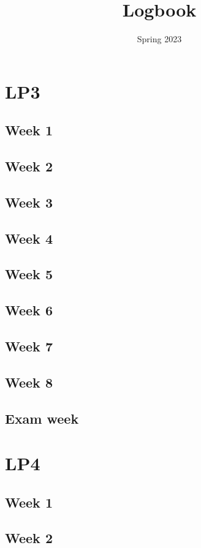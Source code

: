 \documentclass{article}
\title{Logbook}
\date{Spring 2023}
\newcommand{\logentry}[2]{
    \subsection{Week #2}
    
    \newpage
}
\newcommand{\customlogentry}[3]{
    \subsection{#3}
    
    \newpage
}
\begin{document}
\maketitle
\newpage
\tableofcontents
\newpage


\section{LP3}
    \logentry{3}{1}
    \logentry{3}{2}
    \logentry{3}{3}
    \logentry{3}{4}
    \logentry{3}{5}
    \logentry{3}{6}
    \logentry{3}{7}
    \logentry{3}{8}
    \customlogentry{3}{Exam}{Exam week}

\section{LP4}
    \logentry{4}{1}
    \logentry{4}{2}
\end{document}

